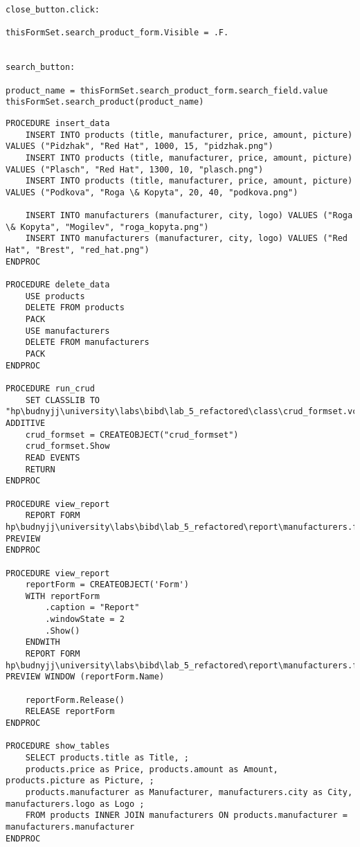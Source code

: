\begin{lstlisting}[caption=manufacturer\_search\_form procedures]
close_button.click:

thisFormSet.search_product_form.Visible = .F.


search_button:

product_name = thisFormSet.search_product_form.search_field.value
thisFormSet.search_product(product_name)
\end{lstlisting}

\begin{lstlisting}[caption=procedures]
PROCEDURE insert_data
	INSERT INTO products (title, manufacturer, price, amount, picture) VALUES ("Pidzhak", "Red Hat", 1000, 15, "pidzhak.png")
	INSERT INTO products (title, manufacturer, price, amount, picture) VALUES ("Plasch", "Red Hat", 1300, 10, "plasch.png")
	INSERT INTO products (title, manufacturer, price, amount, picture) VALUES ("Podkova", "Roga \& Kopyta", 20, 40, "podkova.png")
	
	INSERT INTO manufacturers (manufacturer, city, logo) VALUES ("Roga \& Kopyta", "Mogilev", "roga_kopyta.png")
	INSERT INTO manufacturers (manufacturer, city, logo) VALUES ("Red Hat", "Brest", "red_hat.png")
ENDPROC

PROCEDURE delete_data
	USE products
	DELETE FROM products
	PACK
	USE manufacturers
	DELETE FROM manufacturers
	PACK
ENDPROC

PROCEDURE run_crud
	SET CLASSLIB TO "hp\budnyjj\university\labs\bibd\lab_5_refactored\class\crud_formset.vcx" ADDITIVE
	crud_formset = CREATEOBJECT("crud_formset")
	crud_formset.Show
	READ EVENTS
	RETURN
ENDPROC

PROCEDURE view_report
	REPORT FORM hp\budnyjj\university\labs\bibd\lab_5_refactored\report\manufacturers.frx PREVIEW
ENDPROC

PROCEDURE view_report
	reportForm = CREATEOBJECT('Form')
	WITH reportForm
		.caption = "Report"
		.windowState = 2
		.Show()
	ENDWITH
	REPORT FORM hp\budnyjj\university\labs\bibd\lab_5_refactored\report\manufacturers.frx PREVIEW WINDOW (reportForm.Name)
	
	reportForm.Release()
	RELEASE reportForm
ENDPROC

PROCEDURE show_tables
	SELECT products.title as Title, ;
	products.price as Price, products.amount as Amount, products.picture as Picture, ;
	products.manufacturer as Manufacturer, manufacturers.city as City, manufacturers.logo as Logo ;
	FROM products INNER JOIN manufacturers ON products.manufacturer = manufacturers.manufacturer
ENDPROC
\end{lstlisting}